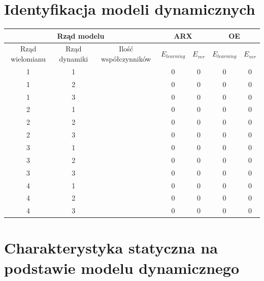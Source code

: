 \section{Identyfikacja modeli dynamicznych}
\begin{table}[H]
\centering
\begin{tabular}{|c|c|c|c|c|c|c|}
\hline
\multicolumn{3}{|c|}{Rząd modelu}                      & \multicolumn{2}{c|}{ARX}   & \multicolumn{2}{c|}{OE}    \\ \hline
Rząd wielomianu & Rząd dynamiki & Ilość współczynników & $E_{learning}$ & $E_{ver}$ & $E_{learning}$ & $E_{ver}$ \\ \hline
1               & 1             &                      & 0              & 0         & 0              & 0         \\ \hline
1               & 2             &                      & 0              & 0         & 0              & 0         \\ \hline
1               & 3             &                      & 0              & 0         & 0              & 0         \\ \hline
2               & 1             &                      & 0              & 0         & 0              & 0         \\ \hline
2               & 2             &                      & 0              & 0         & 0              & 0         \\ \hline
2               & 3             &                      & 0              & 0         & 0              & 0         \\ \hline
3               & 1             &                      & 0              & 0         & 0              & 0         \\ \hline
3               & 2             &                      & 0              & 0         & 0              & 0         \\ \hline
3               & 3             &                      & 0              & 0         & 0              & 0         \\ \hline
4               & 1             &                      & 0              & 0         & 0              & 0         \\ \hline
4               & 2             &                      & 0              & 0         & 0              & 0         \\ \hline
4               & 3             &                      & 0              & 0         & 0              & 0         \\ \hline
\end{tabular}
\end{table}
\section{Charakterystyka statyczna na podstawie modelu dynamicznego}